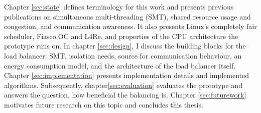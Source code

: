Chapter \ref{sec:state} defines terminology for this work and presents previous
publications on simultaneous multi-threading (SMT), shared resource usage and
congestion, and communication awareness.
It also presents Linux's completely fair scheduler, Fiasco.OC and L4Re, and
properties of the CPU architecture the prototype runs on.
In chapter \ref{sec:design}, I discuss the building blocks for the load
balancer: SMT, isolation needs, source for communication behaviour, an energy
consumption model, and the architecture of the load balancer itself.
Chapter \ref{sec:implementation} presents implementation details and
implemented algorithms.
Subsequently, chapter\ref{sec:evaluation} evaluates the prototype and answers
the question, how beneficial the balancing is.
Chapter \ref{sec:futurework} motivates future research on this topic and
concludes this thesis.


\cleardoublepage

